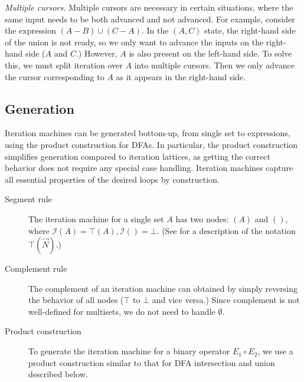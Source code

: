 \documentclass[acmsmall,screen,nonacm]{acmart}\settopmatter{printfolios=true,printccs=false,printacmref=false}
\newcommand*{\interp}{\mathcal{I}}
\newcommand{\hide}[1]{}
\begin{document}
\emph{Multiple cursors.}
Multiple cursors are necessary in certain situations, where the same input needs to be both advanced and not advanced.
For example, consider the expression
$(A - B) \cup (C - A)$.
In the $(A, C)$ state, the right-hand side of the union is not ready, so we only want to advance the
inputs on the right-hand side ($A$ and $C$.) However, $A$ is also present on the left-hand side.
To solve this, we must split iteration over $A$ into multiple cursors. Then we only advance the cursor
corresponding to $A$ as it appears in the right-hand side.

\subsection{Generation}
Iteration machines can be generated bottom-up, from single
set to expressions, using the product construction for DFAs.
In particular, the product construction simplifies generation
compared to iteration lattices, as getting the correct behavior does not require any special case handling.
Iteration machines capture all essential properties of the desired loops by construction.

\begin{description}

\item[Segment rule]
The iteration machine for a single set $A$ has two nodes:
$(A)$ and $()$, where $\interp(A) = \top(A), \interp() = \bot$. (See  for a description of the notation $\top(\vec{N})$.)

\item[Complement rule]
The complement of an iteration machine can obtained by simply
reversing the behavior of all nodes ($\top$ to $\bot$ and vice versa.)
Since complement is not well-defined for multisets, we do not need to
handle $\emptyset$.

\item[Product construction]
To generate the iteration machine for a binary operator
$E_1 \circ E_2$, we use a product construction similar to that for
DFA intersection and union described below.
\end{description}
\hide{
\begin{minipage}{0.1\textwidth}\centering
        \begin{tikzpicture}[y=1.5cm,scale=0.7,every node/.style={font=\footnotesize}]
            \node[circle,draw,minimum size=2.5em, inner sep=1pt] (n2) at (0, 0) {$A$};
            \node[circle,draw,minimum size=2.5em, inner sep=1pt] (n3) at (0, -1) {$\bot$};
                \node[draw=red,cross out,minimum size=2.5em] at (n3) {};
    
            \draw (n2) -- (n3);
        \end{tikzpicture}
        \captionof{figure}{Segment rule for $A$.}
        \label{fig:segrule}
\end{minipage}
}
\end{document}
